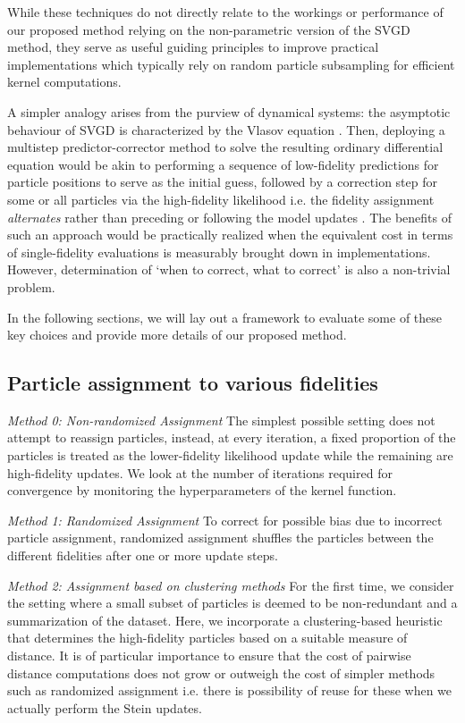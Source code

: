 \documentclass[12pt]{article}
\renewcommand{\[}{\left[}
\renewcommand{\]}{\right]}
\renewcommand{\(}{\left(}
\renewcommand{\)}{\right)}
\begin{document}
While these techniques do not directly relate to the workings or performance of our proposed method relying on the non-parametric version of the SVGD method, they serve as useful guiding principles to improve practical implementations which typically rely on random particle subsampling for efficient kernel computations. 

A simpler analogy arises from the purview of dynamical systems: the asymptotic behaviour of SVGD is characterized by the Vlasov equation \citep{liu_stein_2017}. 
Then, deploying a multistep predictor-corrector method to solve the resulting ordinary differential equation would be akin to performing a sequence of low-fidelity predictions for particle positions to serve as the initial guess, followed by a correction step for some or all particles via the high-fidelity likelihood i.e. the fidelity assignment \emph{alternates} rather than preceding or following the model updates .
The benefits of such an approach would be practically realized when the equivalent cost in terms of single-fidelity evaluations is measurably brought down in implementations. 
However, determination of `when to correct, what to correct' is also a non-trivial problem.

In the following sections, we will lay out a framework to evaluate some of these key choices and provide more details of our proposed method.

\subsection{Particle assignment to various fidelities}

\emph{Method 0: Non-randomized Assignment}
The simplest possible setting does not attempt to reassign particles, instead, at every iteration, a fixed proportion of the particles is treated as the lower-fidelity likelihood update while the remaining are high-fidelity updates. 
We look at the number of iterations required for convergence by monitoring the hyperparameters of the kernel function.

\noindent \emph{Method 1: Randomized Assignment}
To correct for possible bias due to incorrect particle assignment, randomized assignment shuffles the particles between the different fidelities after one or more update steps.

\noindent \emph{Method 2: Assignment based on clustering methods}
For the first time, we consider the setting where a small subset of particles is deemed to be non-redundant and a summarization of the dataset. Here, we incorporate a clustering-based heuristic that determines the high-fidelity particles based on a suitable measure of distance.
It is of particular importance to ensure that the cost of pairwise distance computations does not grow or outweigh the cost of simpler methods such as randomized assignment i.e. there is possibility of reuse for these when we actually perform the Stein updates.
\end{document}
